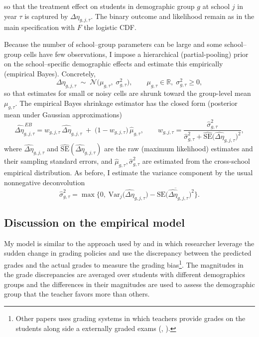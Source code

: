 so that the treatment effect on students in demographic group $g$ at school $j$ in year $\tau$ is captured by $\Delta\eta_{g,j,\tau}$. The binary outcome and likelihood remain as in the main specification with $F$ the logistic CDF.

Because the number of school–group parameters can be large and some school–group cells have few observations, I impose a hierarchical (partial-pooling) prior on the school–specific demographic effects and estimate this empirically (empirical Bayes). Concretely,
\[
\Delta\eta_{g,j,\tau} \;\sim\; \mathcal{N}\!\big(\mu_{g,\tau},\;\sigma^2_{g,\tau}\big),
\qquad
\mu_{g,\tau}\in\mathbb{R},\; \sigma^2_{g,\tau}\ge 0,
\]
so that estimates for small or noisy cells are shrunk toward the group-level mean $\mu_{g,\tau}$. The empirical Bayes shrinkage estimator has the closed form (posterior mean under Gaussian approximations)
\[
\widehat{\Delta\eta}^{\,EB}_{g,j,\tau}
=
w_{g,j,\tau}\,\widehat{\Delta\eta}_{g,j,\tau}
\;+\;
\big(1-w_{g,j,\tau}\big)\,\widehat{\mu}_{g,\tau},
\qquad
w_{g,j,\tau}
=
\frac{\widehat{\sigma}^2_{g,\tau}}
     {\widehat{\sigma}^2_{g,\tau} + \widehat{\mathrm{SE}}\!\big(\widehat{\Delta\eta}_{g,j,\tau}\big)^{2}},
\]
where $\widehat{\Delta\eta}_{g,j,\tau}$ and $\widehat{\mathrm{SE}}(\widehat{\Delta\eta}_{g,j,\tau})$ are the raw (maximum likelihood) estimates and their sampling standard errors, and $\widehat{\mu}_{g,\tau},\widehat{\sigma}^2_{g,\tau}$ are estimated from the cross-school empirical distribution. As before, I estimate the variance component by the usual nonnegative deconvolution
\[
\widehat{\sigma}^2_{g,\tau}
=
\max\!\Big\{0,\;
    \mathrm{Var}_j\!\big(\widehat{\Delta\eta}_{g,j,\tau}\big)
    - 
    \overline{\mathrm{SE}\!\big(\widehat{\Delta\eta}_{g,j,\tau}\big)^{2}}
\Big\}.
\]


\subsection{Discussion on the empirical model}
My model is similar to the approach used by \cite{10.1162/00335530360698441} \cite{neal2008} and \cite{dee2019} in which researcher leverage the sudden change in grading policies and use the discrepancy between the predicted grades and the actual grades to measure the grading bias\footnote{Other papers uses grading systems in which teachers provide grades on the students along side a externally graded exams (\cite{lavy2009}\cite{lavy2018}, \cite{ferman2022}).}. The magnitudes in the grade discrepancies are averaged over students with different demographics groups and the differences in their magnitudes are used to assess the demographic group that the teacher favors more than others. 

